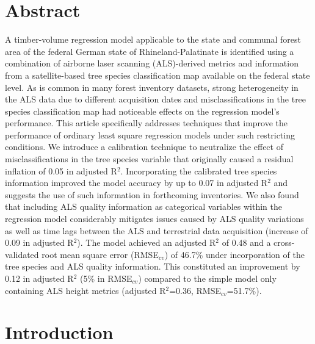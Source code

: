 \section*{Abstract}
\label{chap:regmod:Abstract}
A timber-volume regression model applicable to the state and communal forest area of the federal German state of Rhineland-Palatinate is identified using a combination of airborne laser scanning (ALS)-derived metrics and information from a satellite-based tree species classification map available on the federal state level. As is common in many forest inventory datasets, strong heterogeneity in the ALS data due to different acquisition dates and misclassifications in the tree species classification map had noticeable effects on the regression model's performance. This article specifically addresses techniques that improve the performance of ordinary least square regression models under such restricting conditions. We introduce a calibration technique to neutralize the effect of misclassifications in the tree species variable that originally caused a residual inflation of 0.05 in adjusted R$^2$. Incorporating the calibrated tree species information improved the model accuracy by up to 0.07 in adjusted R$^2$ and suggests the use of such information in forthcoming inventories. We also found that including ALS quality information as categorical variables within the regression model considerably mitigates issues caused by ALS quality variations as well as time lags between the ALS and terrestrial data acquisition (increase of 0.09 in adjusted R$^2$). The model achieved an adjusted R$^2$ of 0.48 and a cross-validated root mean square error (RMSE$_{cv}$) of 46.7\% under incorporation of the tree species and ALS quality information. This constituted an improvement by 0.12 in adjusted R$^2$ (5\% in RMSE$_{cv}$) compared to the simple model only containing ALS height metrics (adjusted R$^2$=0.36, RMSE$_{cv}$=51.7\%).



\section{Introduction}
\label{sec:regmod:intro}


